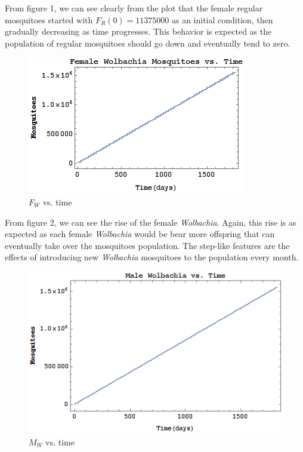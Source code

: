 \documentclass{article}
\begin{document}
From figure 1, we can see clearly from the plot that the female regular mosquitoes started with $F_R(0)=11375000$ as an initial condition, then gradually decreasing as time progresses. This behavior is expected as the population of regular mosquitoes should go down and eventually tend to zero.\\
\begin{figure}[h!]
  \includegraphics[width=\linewidth]{FwVSt}
  \caption{$F_W$ vs. time}
  \label{fig:fwvst}
\end{figure}

From figure 2, we can see the rise of the female \textit{Wolbachia}.  Again, this rise is as expected as each female \textit{Wolbachia} would be bear more offspring that can eventually take over the mosquitoes population. The step-like features are the effects of introducing new \textit{Wolbachia} mosquitoes to the population every month. \\

\begin{figure}[h!]
  \includegraphics[width=\linewidth]{MwVsT}
  \caption{$M_W$ vs. time}
  \label{fig:mwvst}
\end{figure}
\end{document}

